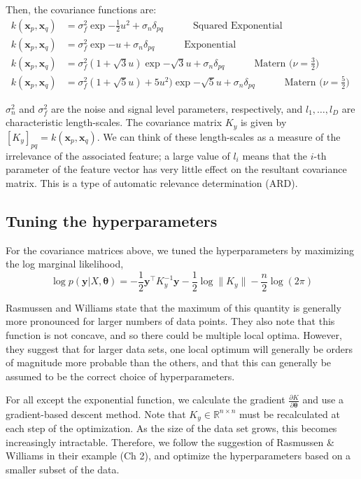 \documentclass{article} %
\def\bfx{\mathbf x}
\def\bfy{\mathbf y}
\def\bftheta{\mathbf \theta}
\def\R{\mathbb R}
\begin{document}
Then, the covariance functions are:
\begin{align}
	k(\bfx_p, \bfx_q) &= \sigma_f^2 \exp{- \frac{1}{2} u^2} + \sigma_n \delta_{pq} \quad \quad \quad \mbox{Squared Exponential}   \\
	k(\bfx_p, \bfx_q) &= \sigma_f^2 \exp{- u} + \sigma_n \delta_{pq} \quad \quad \quad \mbox{Exponential}   \\
	k(\bfx_p, \bfx_q) &= \sigma_f^2 \left( 1 + \sqrt{3} u \right) \exp{- \sqrt{3}  u} + \sigma_n \delta_{pq} \quad \quad \quad \mbox{Matern ($\nu = \frac{3}{2}$) }   \\
	k(\bfx_p, \bfx_q) &= \sigma_f^2 \left( 1 + \sqrt{5} u \right) + 5 u^2) \exp{- \sqrt{5} u} + \sigma_n \delta_{pq} \quad \quad \quad \mbox{Matern ($\nu = \frac{5}{2}$) }
\end{align}

$\sigma_n^2$ and $\sigma_f^2$ are the noise and signal level parameters, respectively, and $l_1, \dots, l_D$ are characteristic length-scales.
The covariance matrix $K_y$ is given by $[K_y]_{pq} = k(\bfx_p, \bfx_q)$.
We can think of these length-scales as a measure of the irrelevance of the associated feature; a large value of $l_i$ means that the $i$-th parameter of the feature vector has very little effect on the resultant covariance matrix.
This is a type of automatic relevance determination (ARD).


\subsection{Tuning the hyperparameters}
For the covariance matrices above, we tuned the hyperparameters by maximizing the log marginal likelihood, 
\begin{equation}
	\log p(\bfy | X, \bftheta) = - \frac{1}{2} \bfy^\top K_y^{-1} \bfy - \frac{1}{2} \log \| K_y \| - \frac{n}{2} \log (2 \pi)
\end{equation}

Rasmussen and Williams state that the maximum of this quantity is generally more pronounced for larger numbers of data points.
They also note that this function is not concave, and so there could be multiple local optima.
However, they suggest that for larger data sets, one local optimum will generally be orders of magnitude more probable than the others, and that this can generally be assumed to be the correct choice of hyperparameters.

For all except the exponential function, we calculate the gradient $\frac{\partial K} {\partial \bftheta}$ and use a gradient-based descent method.
Note that $K_y \in \R^{n \times n}$ must be recalculated at each step of the optimization.
As the size of the data set grows, this becomes increasingly intractable.
Therefore, we follow the suggestion of Rasmussen \& Williams in their example (Ch 2), and optimize the hyperparameters based on a smaller subset of the data.
\end{document}

